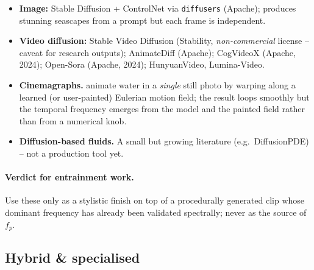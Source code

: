 \documentclass[11pt,a4paper]{article}
\newcommand{\code}[1]{\texttt{\small #1}}
\begin{document}
\begin{itemize}[leftmargin=1.5em,itemsep=0.3em]
  \item \textbf{Image:} Stable Diffusion + ControlNet via
        \code{diffusers} (Apache); produces stunning seascapes from a
        prompt but each frame is independent.
  \item \textbf{Video diffusion:} Stable Video Diffusion
        (Stability, \emph{non-commercial} license -- caveat for research
        outputs); AnimateDiff (Apache); CogVideoX
        \citep{cogvideox} (Apache, 2024); Open-Sora (Apache, 2024);
        HunyuanVideo, Lumina-Video.
  \item \textbf{Cinemagraphs.} \citet{holynski2021} animate water in a
        \emph{single} still photo by warping along a learned (or
        user-painted) Eulerian motion field; the result loops smoothly
        but the temporal frequency emerges from the model and the
        painted field rather than from a numerical knob.
  \item \textbf{Diffusion-based fluids.} A small but growing literature
        (e.g.\ DiffusionPDE) -- not a production tool yet.
\end{itemize}

\paragraph{Verdict for entrainment work.} Use these only as a stylistic
finish on top of a procedurally generated clip whose dominant frequency
has already been validated spectrally; never as the source of $f_p$.

\subsection{Hybrid \& specialised}
\end{document}
